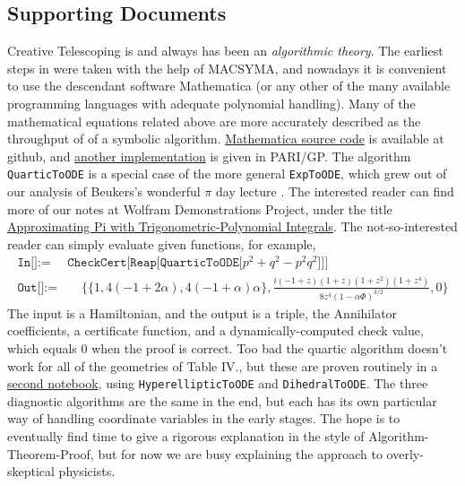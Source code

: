 \documentclass[nofootinbib,preprint]{revtex4-1}
\begin{document}
\begin{appendices}
\section{Supporting Documents}

Creative Telescoping is and always has been an \textit{algorithmic theory}. The earliest 
steps in \cite{GOSPER1978} were taken with the help of MACSYMA, and nowadays it is convenient 
to use the descendant software Mathematica (or any other of the many available programming 
languages with adequate polynomial handling). Many of the mathematical equations related above 
are more accurately described as the throughput of of a symbolic algorithm. 
\href{https://github.com/bradklee/Dissertation/tree/master/Prelude/notebooks}{Mathematica source 
code} is available at github, and \href{https://github.com/bradklee/IntegralDiffEQ}{another implementation}
is given in PARI/GP. The algorithm \texttt{QuarticToODE} is a special case of the more general \texttt{ExpToODE}, 
which grew out of our analysis of Beukers's wonderful $\pi$ day lecture \cite{BEUKERS2000}. The interested reader 
can find more of our notes at Wolfram Demonstrations Project, under the title 
\href{https://demonstrations.wolfram.com/ApproximatingPiWithTrigonometricPolynomialIntegrals/}{Approximating 
Pi with Trigonometric-Polynomial Integrals}. The not-so-interested reader can simply evaluate given 
functions, for example,
\begin{eqnarray}
\texttt{In[]:=}& \texttt{CheckCert[Reap[QuarticToODE[$p^2+q^2-p^2 q^2$]]]} \nonumber \\
\texttt{Out[]:=}&  \;\;\;\; \bigg\{\big\{1, 4 (-1 + 2 \alpha), 4 (-1 + \alpha) \alpha \big\}, 
\frac{ i (-1 + z) (1 + z) (1 + z^2) (1 + z^4)}{8 z^4 (1 - \alpha \Phi)^{3/2}}, 0 \bigg\} \nonumber
\end{eqnarray}
The input is a Hamiltonian, and the output is a triple, the Annihilator coefficients, 
a certificate function, and a dynamically-computed check value, which equals $0$ when 
the proof is correct. Too bad the quartic algorithm doesn't work for all of the geometries
of Table IV., but these are proven routinely in a 
\href{https://github.com/bradklee/Dissertation/tree/master/Prelude/notebooks}{second notebook},
using \texttt{HyperellipticToODE} and \texttt{DihedralToODE}. The three diagnostic algorithms 
are the same in the end, but each has its own particular way of handling coordinate variables
in the early stages. 
The hope is to eventually find time to give a rigorous explanation in the style of 
Algorithm-Theorem-Proof, but for now we are busy explaining the approach to overly-skeptical 
physicists. 


\end{appendices}
\end{document}
